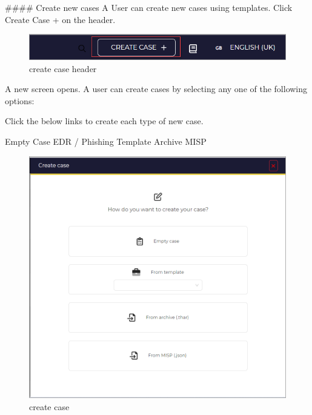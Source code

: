 


\begin{markdown}
#### Create new cases
A User can create new cases using templates.
Click Create Case + on the header.
\end{markdown}

\begin{figure}[H]
    \centering
    \includegraphics[width=\textwidth]{images/docs/analyst/cases/create/create_case_header.png}
    \caption{create case header}
    \label{fig:modules}
\end{figure}

\begin{markdown}

A new screen opens. A user can create cases by selecting any one of the following options:

Click the below links to create each type of new case.

Empty Case
EDR / Phishing Template
Archive
MISP
\end{markdown}



\begin{figure}[H]
    \centering
    \includegraphics[width=\textwidth]    {images/docs/analyst/cases/create/create_case.png}
    \caption{create case}
    \label{fig:modules}
\end{figure}


